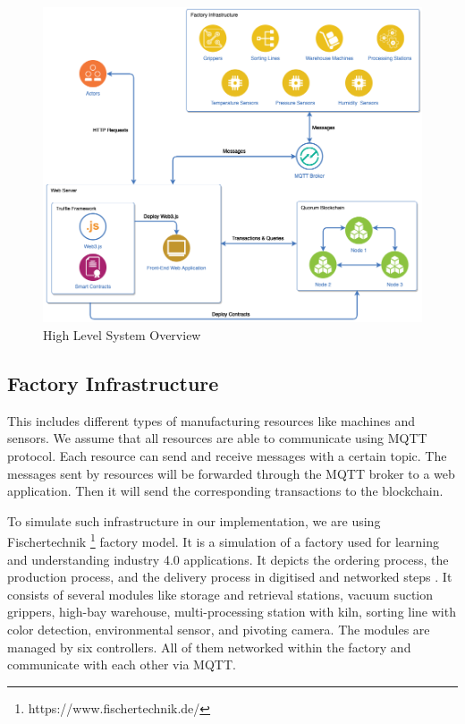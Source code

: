 \documentclass[runningheads]{llncs}
\begin{document}
\begin{figure}
\centering
\includegraphics[width=1\textwidth]{figures/system_overview_2.png}
\caption{High Level System Overview}
\label{fig:system_overview}
\end{figure}

\subsection{Factory Infrastructure}
This includes different types of manufacturing resources like machines and sensors. We assume that all resources are able to communicate using MQTT protocol. Each resource can send and receive messages with a certain topic. The messages sent by resources will be forwarded through the MQTT broker to a web application. Then it will send the corresponding transactions to the blockchain.

\bigbreak

\noindent To simulate such infrastructure in our implementation, we are using Fischertechnik \footnote{https://www.fischertechnik.de/} factory model. It is a simulation of a factory used for learning and understanding industry 4.0 applications. It depicts the ordering process, the production process, and the delivery process in digitised and networked steps \cite{Industry}. It consists of several modules like storage and retrieval stations, vacuum suction grippers, high-bay warehouse, multi-processing station with kiln, sorting line with color detection, environmental sensor, and pivoting camera. The modules are managed by six controllers. All of them networked within the factory and communicate with each other via MQTT.
\end{document}
